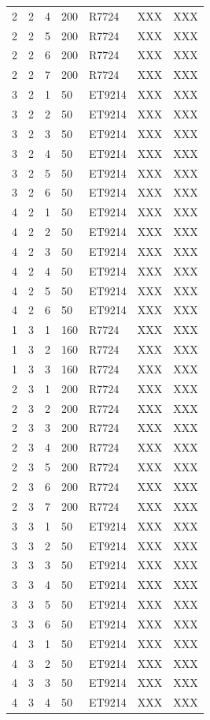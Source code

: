 \documentclass[3p,final,twocolumn]{elsarticle}
\begin{document}
{\begin{table}[ht]
\begin{tabular}{  m{3em} | m{3em} | m{5em} | m{3em} | m{3em} | m{3em} | m{8em} }
2	&2	&4	&200	&R7724	&XXX	&XXX\\ 
2	&2	&5	&200	&R7724	&XXX	&XXX\\ 
2	&2	&6	&200	&R7724	&XXX	&XXX\\ 
2	&2	&7	&200	&R7724	&XXX	&XXX\\ 
3	&2	&1	&50	&ET9214	&XXX	&XXX\\ 
3	&2	&2	&50	&ET9214	&XXX	&XXX\\ 
3	&2	&3	&50	&ET9214	&XXX	&XXX\\ 
3	&2	&4	&50	&ET9214	&XXX	&XXX\\ 
3	&2	&5	&50	&ET9214	&XXX	&XXX\\ 
3	&2	&6	&50	&ET9214	&XXX	&XXX\\ 
4	&2	&1	&50	&ET9214	&XXX	&XXX\\ 
4	&2	&2	&50	&ET9214	&XXX	&XXX\\ 
4	&2	&3	&50	&ET9214	&XXX	&XXX\\ 
4	&2	&4	&50	&ET9214	&XXX	&XXX\\ 
4	&2	&5	&50	&ET9214	&XXX	&XXX\\ 
4	&2	&6	&50	&ET9214	&XXX	&XXX\\ 
1	&3	&1	&160	&R7724	&XXX	&XXX\\ 
1	&3	&2	&160	&R7724	&XXX	&XXX\\ 
1	&3	&3	&160	&R7724	&XXX	&XXX\\ 
2	&3	&1	&200	&R7724	&XXX	&XXX\\ 
2	&3	&2	&200	&R7724	&XXX	&XXX\\ 
2	&3	&3	&200	&R7724	&XXX	&XXX\\ 
2	&3	&4	&200	&R7724	&XXX	&XXX\\ 
2	&3	&5	&200	&R7724	&XXX	&XXX\\ 
2	&3	&6	&200	&R7724	&XXX	&XXX\\ 
2	&3	&7	&200	&R7724	&XXX	&XXX\\ 
3	&3	&1	&50	&ET9214	&XXX	&XXX\\ 
3	&3	&2	&50	&ET9214	&XXX	&XXX\\ 
3	&3	&3	&50	&ET9214	&XXX	&XXX\\ 
3	&3	&4	&50	&ET9214	&XXX	&XXX\\ 
3	&3	&5	&50	&ET9214	&XXX	&XXX\\ 
3	&3	&6	&50	&ET9214	&XXX	&XXX\\ 
4	&3	&1	&50	&ET9214	&XXX	&XXX\\ 
4	&3	&2	&50	&ET9214	&XXX	&XXX\\ 
4	&3	&3	&50	&ET9214	&XXX	&XXX\\ 
4	&3	&4	&50	&ET9214	&XXX	&XXX\\ 

\end{tabular}
\end{table}}
\end{document}
